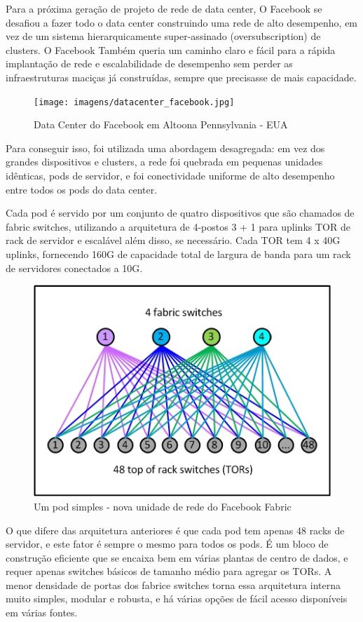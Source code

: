 \documentclass[12pt,a4paper]{report}
\begin{document}
Para a próxima geração de projeto de rede de data center, O Facebook se desafiou a fazer todo o data center construindo uma rede de alto desempenho, em vez de um sistema hierarquicamente super-assinado (oversubscription) de clusters. 
O Facebook Também queria um caminho claro e fácil para a rápida implantação de rede e escalabilidade de desempenho sem perder as
infraestruturas maciças já construídas, sempre que precisasse de mais capacidade.

\begin{figure}[H]
\centering
\texttt{[image: imagens/datacenter\_facebook.jpg]}
\caption{Data Center do Facebook em Altoona Pennsylvania - EUA}
\label{dc_container}
\end{figure}

Para conseguir isso, foi utilizada uma abordagem desagregada: 
em vez dos grandes dispositivos e clusters, 
a rede foi quebrada em pequenas unidades idênticas, 
pods de servidor, e foi conectividade uniforme de alto desempenho entre todos os pods do data center.


Cada pod é servido por um conjunto de quatro dispositivos que são chamados de fabric switches, utilizando a arquitetura de 4-postos 3 + 1 para 
uplinks TOR de rack de servidor e escalável além disso, se necessário. Cada TOR tem  4 x 40G uplinks, 
fornecendo 160G de capacidade total de largura de banda para um rack de servidores conectados a 10G.

\begin{figure}[H]
\centering
\includegraphics[width=.7\textwidth]{imagens/pod.jpg}
\caption{Um pod simples - nova unidade de rede do Facebook Fabric}
\label{dc_container}
\end{figure}


O que difere das arquitetura anteriores é que cada pod tem apenas 48 racks de servidor, 
e este fator é sempre o mesmo para todos os pods. 
É um bloco de construção eficiente que se encaixa bem em várias plantas de centro de dados,
e requer apenas switches básicos de tamanho médio para agregar os TORs. 
A menor densidade de portas dos fabrice switches torna essa arquitetura interna muito simples, 
modular e robusta, e há várias opções de fácil acesso disponíveis em várias fontes.
\end{document}

